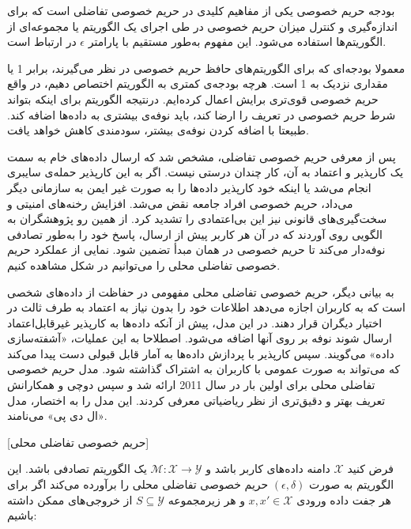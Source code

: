 
بودجه حریم خصوصی یکی از مفاهیم کلیدی در حریم خصوصی تفاضلی است که برای اندازه‌گیری و کنترل میزان حریم خصوصی در طی اجرای یک الگوریتم یا مجموعه‌ای از الگوریتم‌ها استفاده می‌شود. این مفهوم به‌طور مستقیم با پارامتر $\epsilon$ در ارتباط است.

معمولا بودجه‌ای که برای الگوریتم‌های حافظ حریم خصوصی در نظر می‌گیرند، برابر 1 یا مقداری نزدیک به 1 است. هرچه بودجه‌ی کمتری به الگوریتم اختصاص دهیم، در واقع حریم خصوصی قوی‌تری برایش اعمال کرده‌ایم. درنتیجه الگوریتم برای اینکه بتواند شرط حریم خصوصی در تعریف  را ارضا کند، باید نوفه‌ی بیشتری به داده‌ها اضافه کند. طبیعتا با اضافه کردن نوفه‌ی بیشتر، سودمندی کاهش خواهد یافت.


پس از معرفی حریم خصوصی تفاضلی، مشخص شد که ارسال داده‌های خام به سمت یک کارپذیر و اعتماد به آن، کار چندان درستی نیست. اگر به این کارپذیر حمله‌ی سایبری انجام می‌شد یا اینکه خود کارپذیر داده‌ها را به صورت غیر ایمن به سازمانی دیگر می‌داد، حریم خصوصی افراد جامعه نقض می‌شد. افزایش رخنه‌های امنیتی و سخت‌گیری‌های قانونی نیز این بی‌اعتمادی را تشدید کرد. از همین رو پژوهشگران به الگویی روی آوردند که در آن هر کاربر پیش از ارسال، پاسخ خود را به‌طور تصادفی نوفه‌دار می‌کند تا حریم خصوصی در همان مبدأ تضمین شود. نمایی از عملکرد حریم خصوصی تفاضلی محلی را می‌توانیم در شکل  مشاهده کنیم.

به بیانی دیگر، حریم خصوصی تفاضلی محلی مفهومی در حفاظت از داده‌های شخصی است که به کاربران اجازه می‌دهد اطلاعات خود را بدون نیاز به اعتماد به طرف ثالث در اختیار دیگران قرار دهند. در این مدل، پیش از آنکه داده‌ها به کارپذیر غیرقابل‌اعتماد ارسال شوند نوفه بر روی آنها اضافه می‌شود. اصطلاحا به این عملیات، «آشفته‌سازی داده» می‌گویند. سپس کارپذیر با پردازش داده‌ها به آمار قابل قبولی دست پیدا می‌کند که می‌تواند به صورت عمومی با کاربران به اشتراک گذاشته شود. مدل حریم خصوصی تفاضلی محلی برای اولین بار در سال 2011  ارائه شد و سپس دوچی و همکارانش  تعریف بهتر و دقیق‌تری از نظر ریاضیاتی معرفی کردند. این مدل را به اختصار، مدل «ال دی پی» می‌نامند.

[حریم خصوصی تفاضلی محلی]

فرض کنید $\mathcal{X}$ دامنه داده‌های کاربر باشد و $\mathcal{M} : \mathcal{X} \to \mathcal{Y}$ یک الگوریتم تصادفی باشد. این الگوریتم به صورت $(\epsilon, \delta)$ حریم خصوصی تفاضلی محلی را برآورده می‌کند اگر برای هر جفت داده ورودی $x, x' \in \mathcal{X}$ و هر زیرمجموعه $S \subseteq \mathcal{Y}$ از خروجی‌های ممکن داشته باشیم:


